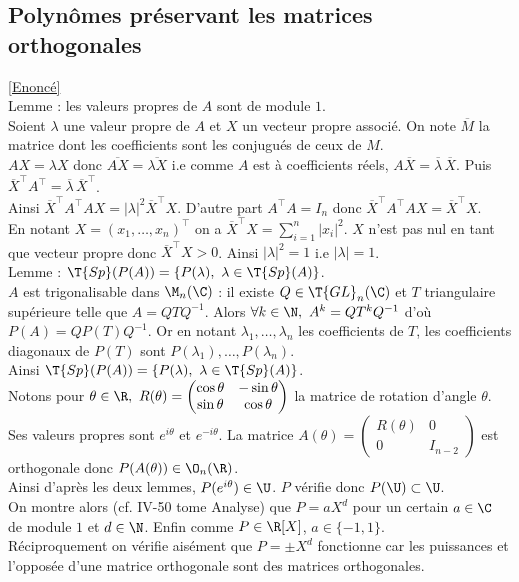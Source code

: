 \documentclass[8pt]{book}
\begin{document}
\subsection{Polynômes préservant les matrices orthogonales }
\label{Polynômes préservant les matrices orthogonales corrigé}
\textcolor{blue}{\hyperref[Polynômes préservant les matrices orthogonales]{[Enoncé]}}\\
Lemme : les valeurs propres de $A$ sont de module $1$.\\
Soient $\lambda$ une valeur propre de $A$ et $X$ un vecteur propre associé. On note $\overline M$ la matrice dont les coefficients sont les conjugués de ceux de $M$.\\
$AX=\lambda X$ donc $\overline{AX}=\overline{\lambda X}$ i.e comme $A$ est à coefficients réels, $A\overline X=\overline \lambda\,\overline X$. Puis $\overline{X}^\top A^\top=\overline \lambda\,\overline{X}^\top$.\\
Ainsi $\overline{X}^\top A^\top AX=|\lambda|^2\overline{X}^\top X$. D'autre part $A^\top A=I_n$ donc $\overline{X}^\top A^\top AX=\overline{X}^\top X$.\\
En notant $X=(x_1,\dots,x_n)^\top$ on a $\overline{X}^\top X=\displaystyle\sum_{i=1}^n|x_i|^2$. $X$ n'est pas nul en tant que vecteur propre donc $\overline{X}^\top X>0$. Ainsi $|\lambda|^2=1$ i.e $|\lambda|=1$.\\
Lemme : $\T{Sp}(P(A))=\{P(\lambda),\ \lambda\in \T{Sp}(A)\}$.\\
$A$ est trigonalisable dans $\M_n(\C)$ : il existe $Q\in \T{GL}_n(\C)$ et $T$ triangulaire supérieure telle que $A=QTQ^{-1}$. Alors $\forall k\in \N,\ A^k=QT^kQ^{-1}$ d'où $P(A)=QP(T)Q^{-1}$. Or en notant $\lambda_1,\dots,\lambda_n$ les coefficients de $T$, les coefficients diagonaux de $P(T)$ sont $P(\lambda_1),\dots,P(\lambda_n)$.\\
Ainsi $\T{Sp}(P(A))=\{P(\lambda),\ \lambda\in \T{Sp}(A)\}$.\\
Notons pour $\theta\in \R,\ R(\theta)=\begin{pmatrix}
	\cos\theta&-\sin\theta\\
	\sin\theta&\cos\theta
\end{pmatrix}$ la matrice de rotation d'angle $\theta$. Ses valeurs propres sont $e^{i\theta}$ et $e^{-i\theta}$. La matrice $A(\theta)=\begin{pmatrix}
	R(\theta)&0\\
	0&I_{n-2}
\end{pmatrix}$ est orthogonale donc $P(A(\theta))\in \O_n(\R)$.\\
Ainsi d'après les deux lemmes, $P(e^{i\theta})\in \U$. $P$ vérifie donc $P(\U)\subset \U$.\\
On montre alors (cf. IV-50 tome Analyse) que $P=aX^d$ pour un certain $a\in \C$ de module $1$ et $d\in \N$. Enfin comme $P\in \R[X]$, $a\in \{-1,1\}$.\\
Réciproquement on vérifie aisément que $P=\pm X^d$ fonctionne car les puissances et l'opposée d'une matrice orthogonale sont des matrices orthogonales.
\end{document}
